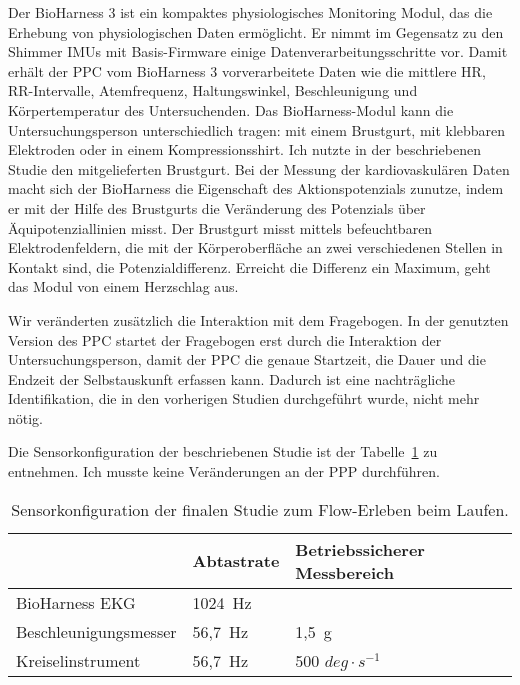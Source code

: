 Der BioHarness 3 ist ein kompaktes physiologisches Monitoring Modul, das die Erhebung von physiologischen Daten ermöglicht. Er nimmt im Gegensatz zu den Shimmer \acp{IMU} mit Basis-Firmware einige Datenverarbeitungsschritte vor. Damit erhält der \ac{PPC} vom BioHarness 3 vorverarbeitete Daten wie die mittlere \ac{HR}, RR-Intervalle, Atemfrequenz, Haltungswinkel, Beschleunigung und Körpertemperatur des Untersuchenden. Das BioHarness-Modul kann die Untersuchungsperson unterschiedlich tragen: mit einem Brustgurt, mit klebbaren Elektroden oder in einem Kompressionsshirt. Ich nutzte in der beschriebenen Studie den mitgelieferten Brustgurt. Bei der Messung der kardiovaskulären Daten macht sich der BioHarness die Eigenschaft des Aktionspotenzials zunutze, indem er mit der Hilfe des Brustgurts die Veränderung des Potenzials über Äquipotenziallinien misst. Der Brustgurt misst mittels befeuchtbaren Elektrodenfeldern, die mit der Körperoberfläche an zwei verschiedenen Stellen in Kontakt sind, die Potenzialdifferenz. Erreicht die Differenz ein Maximum, geht das Modul von einem Herzschlag aus. 

Wir veränderten zusätzlich die Interaktion mit dem Fragebogen. In der genutzten Version des \ac{PPC} startet der Fragebogen erst durch die Interaktion der Untersuchungsperson, damit der \ac{PPC} die genaue Startzeit, die Dauer und die Endzeit der Selbstauskunft erfassen kann. Dadurch ist eine nachträgliche Identifikation, die in den vorherigen Studien durchgeführt wurde, nicht mehr nötig. 

Die Sensorkonfiguration der beschriebenen Studie ist der Tabelle~\ref{tab:sensorkonfiguration_3} zu entnehmen. Ich musste keine Veränderungen an der \ac{PPP} durchführen. 
\begin{table}
	[!htb] \caption[Sensorkonfiguration (Finale Studie: Laufen)]{Sensorkonfiguration der finalen Studie zum Flow-Erleben beim Laufen.} \label{tab:sensorkonfiguration_3} 
	\begin{tabularx}
		{ 
		\textwidth}{p{} p{} p{}} \toprule & Abtastrate & Betriebssicherer Messbereich \\
		\midrule BioHarness \ac{EKG} & 1024~Hz & \\
		Beschleunigungsmesser & 56,7~Hz & 1,5~g \\
		Kreiselinstrument & 56,7~Hz & 500 $deg \cdot s^{-1}$ \\
		\bottomrule 
	\end{tabularx}
\end{table}

